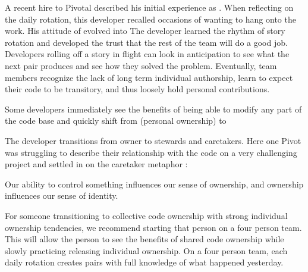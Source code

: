 A recent hire to Pivotal described his initial experience as . When reflecting on the daily rotation, this developer recalled occasions of wanting to hang onto the work.  His attitude of  evolved into  The developer learned the rhythm of story rotation and developed the trust that the rest of the team will do a good job. Developers rolling off a story in flight can look in anticipation to see what the next pair produces and see how they solved the problem. 
Eventually, team members recognize the lack of long term individual authorship, learn to expect their code to be transitory, and thus loosely hold personal contributions.   

Some developers immediately see the benefits of being able to modify any part of the code base and quickly shift from  (personal ownership) to  


The developer transitions from owner to stewards and caretakers. Here one Pivot was struggling to describe their relationship with the code on a very challenging project and settled in on the caretaker metaphor : 

Our ability to control something influences our sense of ownership, and ownership influences our sense of identity. 

For someone transitioning to collective code ownership with strong individual ownership tendencies, we recommend starting that person on a four person team. This will allow the person to see the benefits of shared code ownership while slowly practicing releasing individual ownership. On a four person team, each daily rotation creates pairs with full knowledge of what happened yesterday.  


